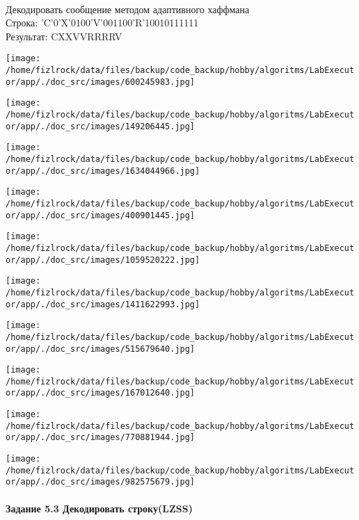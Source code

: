 \documentclass[a4paper, 12pt]{article}
\begin{document}
\\ 

Декодировать сообщение методом адаптивного хаффмана \\
Строка: 
'C'0'X'0100'V'001100'R'10010111111\\
Результат: CXXVVRRRRV

\texttt{[image: /home/fizlrock/data/files/backup/code\_backup/hobby/algoritms/LabExecutor/app/./doc\_src/images/600245983.jpg]}

\texttt{[image: /home/fizlrock/data/files/backup/code\_backup/hobby/algoritms/LabExecutor/app/./doc\_src/images/149206445.jpg]}

\texttt{[image: /home/fizlrock/data/files/backup/code\_backup/hobby/algoritms/LabExecutor/app/./doc\_src/images/1634044966.jpg]}

\texttt{[image: /home/fizlrock/data/files/backup/code\_backup/hobby/algoritms/LabExecutor/app/./doc\_src/images/400901445.jpg]}

\texttt{[image: /home/fizlrock/data/files/backup/code\_backup/hobby/algoritms/LabExecutor/app/./doc\_src/images/1059520222.jpg]}

\texttt{[image: /home/fizlrock/data/files/backup/code\_backup/hobby/algoritms/LabExecutor/app/./doc\_src/images/1411622993.jpg]}

\texttt{[image: /home/fizlrock/data/files/backup/code\_backup/hobby/algoritms/LabExecutor/app/./doc\_src/images/515679640.jpg]}

\texttt{[image: /home/fizlrock/data/files/backup/code\_backup/hobby/algoritms/LabExecutor/app/./doc\_src/images/167012640.jpg]}

\texttt{[image: /home/fizlrock/data/files/backup/code\_backup/hobby/algoritms/LabExecutor/app/./doc\_src/images/770881944.jpg]}

\texttt{[image: /home/fizlrock/data/files/backup/code\_backup/hobby/algoritms/LabExecutor/app/./doc\_src/images/982575679.jpg]}
\pagebreak
\paragraph{Задание 5.3 Декодировать строку(LZSS)\\}
\end{document}
